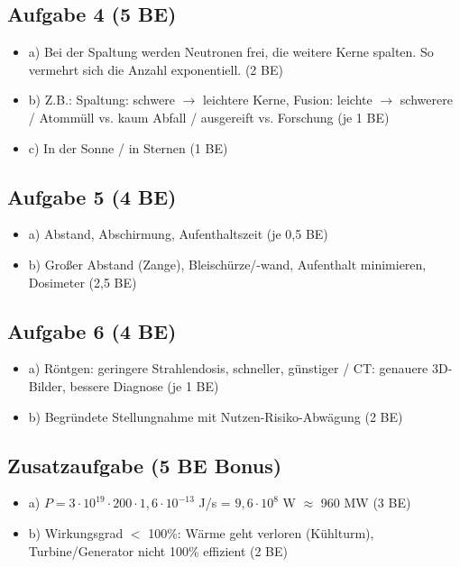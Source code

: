 \documentclass[11pt,a4paper]{article}
\begin{document}
\subsection*{Aufgabe 4 (5 BE)}
\begin{itemize}
    \item a) Bei der Spaltung werden Neutronen frei, die weitere Kerne spalten. So vermehrt sich die Anzahl exponentiell. (2 BE)
    \item b) Z.B.: Spaltung: schwere $\rightarrow$ leichtere Kerne, Fusion: leichte $\rightarrow$ schwerere / Atommüll vs. kaum Abfall / ausgereift vs. Forschung (je 1 BE)
    \item c) In der Sonne / in Sternen (1 BE)
\end{itemize}

\subsection*{Aufgabe 5 (4 BE)}
\begin{itemize}
    \item a) Abstand, Abschirmung, Aufenthaltszeit (je 0,5 BE)
    \item b) Großer Abstand (Zange), Bleischürze/-wand, Aufenthalt minimieren, Dosimeter (2,5 BE)
\end{itemize}

\subsection*{Aufgabe 6 (4 BE)}
\begin{itemize}
    \item a) Röntgen: geringere Strahlendosis, schneller, günstiger / CT: genauere 3D-Bilder, bessere Diagnose (je 1 BE)
    \item b) Begründete Stellungnahme mit Nutzen-Risiko-Abwägung (2 BE)
\end{itemize}

\subsection*{Zusatzaufgabe (5 BE Bonus)}
\begin{itemize}
    \item a) $P = 3 \cdot 10^{19} \cdot 200 \cdot 1{,}6 \cdot 10^{-13}$ J/s = $9{,}6 \cdot 10^{8}$ W $\approx$ 960 MW (3 BE)
    \item b) Wirkungsgrad $<$ 100\%: Wärme geht verloren (Kühlturm), Turbine/Generator nicht 100\% effizient (2 BE)
\end{itemize}
\end{document}
